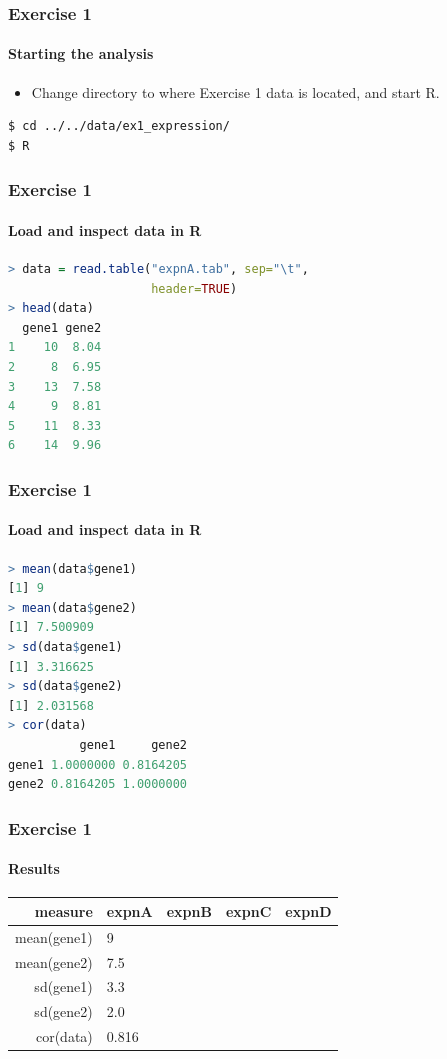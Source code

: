 \documentclass[table]{beamer}
\begin{document}
  \begin{frame}[fragile]
    \frametitle{Exercise 1}
    \framesubtitle{Starting the analysis}
    \begin{itemize}
      \item Change directory to where Exercise 1 data is located, and start R.
    \end{itemize}
    \begin{lstlisting}[language=bash]
$ cd ../../data/ex1_expression/
$ R
    \end{lstlisting}
\end{frame}

  \begin{frame}[fragile]
    \frametitle{Exercise 1}
    \framesubtitle{Load and inspect data in R}
    \begin{lstlisting}[language=R]
> data = read.table("expnA.tab", sep="\t", 
                    header=TRUE)
> head(data)
  gene1 gene2
1    10  8.04
2     8  6.95
3    13  7.58
4     9  8.81
5    11  8.33
6    14  9.96
    \end{lstlisting}
\end{frame}

  \begin{frame}[fragile]
    \frametitle{Exercise 1}
    \framesubtitle{Load and inspect data in R}
    \begin{lstlisting}[language=R]
> mean(data$gene1)
[1] 9
> mean(data$gene2)
[1] 7.500909
> sd(data$gene1)
[1] 3.316625
> sd(data$gene2)
[1] 2.031568
> cor(data)
          gene1     gene2
gene1 1.0000000 0.8164205
gene2 0.8164205 1.0000000
    \end{lstlisting}
\end{frame}

  \begin{frame}
    \frametitle{Exercise 1}
    \framesubtitle{Results}
    \begin{center}
	\begin{tabular}{r|l|l|l|l}
	  measure & expnA & expnB & expnC & expnD \\
	  \hline
	  mean(gene1) & 9     &  &  & \\
	  mean(gene2) & 7.5   &  &  & \\
  	  sd(gene1)   & 3.3   &  &  & \\
  	  sd(gene2)   & 2.0   &  &  & \\  
	  cor(data)   & 0.816 &  &  & \\  
	\end{tabular}
    \end{center}
  \end{frame}
\end{document}
